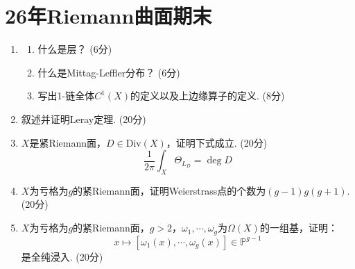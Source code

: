
\section{26年Riemann曲面期末}
\begin{enumerate}
    \item[1.]
    \begin{enumerate}
        \item[(1)] 什么是层？ (6分)
        \item[(2)] 什么是Mittag-Leffler分布？ (6分)
        \item[(3)] 写出1-链全体$C^1(X)$的定义以及上边缘算子的定义. (8分)
    \end{enumerate}

    \item[2.] 叙述并证明Leray定理. (20分)

    \item[3.] $X$是紧Riemann面，$D\in \text{Div}(X)$，证明下式成立. (20分)
    $$
        \frac{1}{2\pi}\int_{X}\Theta_{L_D}=\deg D
    $$

    \item[4.] $X$为亏格为$g$的紧Riemann面，证明Weierstrass点的个数为$(g-1)g(g+1)$. (20分)

    \item[5.] $X$为亏格为$g$的紧Riemann面，$g>2$，$\omega_1,\cdots,\omega_g$为$\Omega(X)$的一组基，证明：
    $$
        x\mapsto [\omega_1(x),\cdots,\omega_g(x)]\in\mathbb{P}^{g-1}
    $$
是全纯浸入. (20分)
\end{enumerate}

